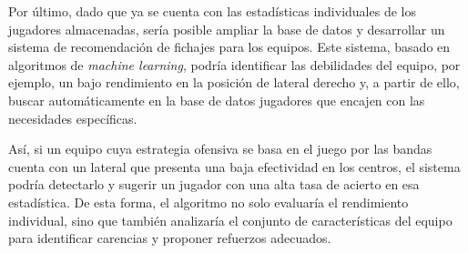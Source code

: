 Por último, dado que ya se cuenta con las estadísticas individuales de los jugadores almacenadas, sería posible ampliar la base de datos y desarrollar un sistema de recomendación de fichajes para los equipos. Este sistema, basado en algoritmos de \textit{machine learning}, podría identificar las debilidades del equipo, por ejemplo, un bajo rendimiento en la posición de lateral derecho y, a partir de ello, buscar automáticamente en la base de datos jugadores que encajen con las necesidades específicas.

Así, si un equipo cuya estrategia ofensiva se basa en el juego por las bandas cuenta con un lateral que presenta una baja efectividad en los centros, el sistema podría detectarlo y sugerir un jugador con una alta tasa de acierto en esa estadística. De esta forma, el algoritmo no solo evaluaría el rendimiento individual, sino que también analizaría el conjunto de características del equipo para identificar carencias y proponer refuerzos adecuados.